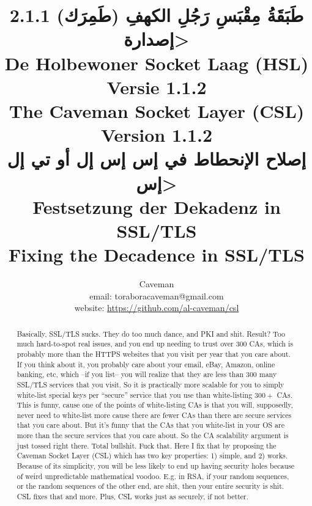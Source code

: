 \documentclass{article}
\author{Caveman\\
email: toraboracaveman@gmail.com\\
website: \url{https://github.com/al-caveman/csl}}
\title{
2.1.1 \<طَبَقَةُ مِقْبَسِ رَجُلِ الكهفِ (طَمِرَك) إصدارة>\\
De Holbewoner Socket Laag (HSL) Versie 1.1.2\\
The Caveman Socket Layer (CSL) Version 1.1.2\\
{\large \<إصلاح الإنحطاط في إس إس إل أو تي إل إس>}\\
{\large Festsetzung der Dekadenz in SSL/TLS}\\
{\large Fixing the Decadence in SSL/TLS}}
\begin{document}
 \maketitle
\begin{abstract}
    Basically, SSL/TLS sucks. They do too much dance, and PKI and shit. Result?
    Too much hard-to-spot real issues, and you end up needing to trust over
    $300$ CAs, which is probably more than the HTTPS websites that you visit
    per year that you care about. If you think about it, you probably care
    about your email, eBay, Amazon, online banking, etc, which --if you list--
    you will realize that they are less than $300$ many SSL/TLS services that
    you visit. So it is practically more scalable for you to simply white-list
    special keys per ``secure'' service that you use than white-listing $300+$
    CAs. This is funny, cause one of the points of white-listing CAs is that
    you will, supposedly, never need to white-list more cause there are fewer
    CAs than there are secure services that you care about. But it's funny that
    the CAs that you white-list in your OS are more than the secure services
    that you care about. So the CA scalability argument is just tossed right
    there. Total bullshit. Fuck that. Here I fix that by proposing the Caveman
    Socket Layer (CSL) which has two key properties: 1) simple, and 2) works.
    Because of its simplicity, you will be less likely to end up having
    security holes because of weird unpredictable mathematical voodoo. E.g. in
    RSA, if your random sequences, or the random sequences of the other end,
    are shit, then your entire security is shit.  CSL fixes that and more.
    Plus, CSL works just as securely, if not better.
\end{abstract}

\tableofcontents
\end{document}
